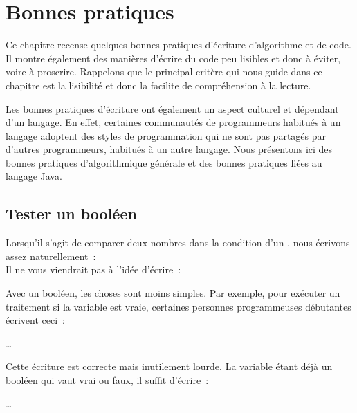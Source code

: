 \chapter{Bonnes pratiques}
\label{bonnespratiques}

	Ce chapitre recense quelques bonnes pratiques d'écriture d'algorithme et de
	code. Il montre également des manières d'écrire du code peu lisibles et donc
	à éviter, voire à proscrire. Rappelons que le principal critère qui nous
	guide dans ce chapitre est la lisibilité et donc la facilite de
	compréhension à la lecture. 
	
	Les bonnes pratiques d'écriture ont également un aspect culturel et
	dépendant d'un langage. En effet, certaines communautés de programmeurs
	habitués à un langage adoptent des styles de programmation qui ne sont pas
	partagés par d'autres programmeurs, habitués à un autre langage. Nous
	présentons ici des bonnes pratiques d'algorithmique générale et des bonnes
	pratiques liées au langage Java. 

\minitoc
	
\section{Tester un booléen}

	Lorsqu’il s’agit de comparer deux nombres dans la condition
	d’un , nous écrivons assez naturellement~:
	\\Il ne vous viendrait pas à l’idée d’écrire~:
	
	\bigskip
		
	Avec un booléen, les choses sont moins simples.  Par exemple, 
	pour exécuter un traitement si la variable  est vraie, certaines
	personnes programmeuses débutantes écrivent ceci~:
	
	\clearpage
	\begin{wrong}
	\begin{pseudocode} 
			\Stmt \dots 
		\EndIf 
	\end{pseudocode} 
	\end{wrong}

	Cette écriture est correcte mais inutilement lourde.  La variable étant déjà
	un booléen qui vaut vrai ou faux, il suffit d’écrire~:

	\begin{pseudocode}
		\If{adult}
			\Stmt \dots
		\EndIf
	\end{pseudocode}


